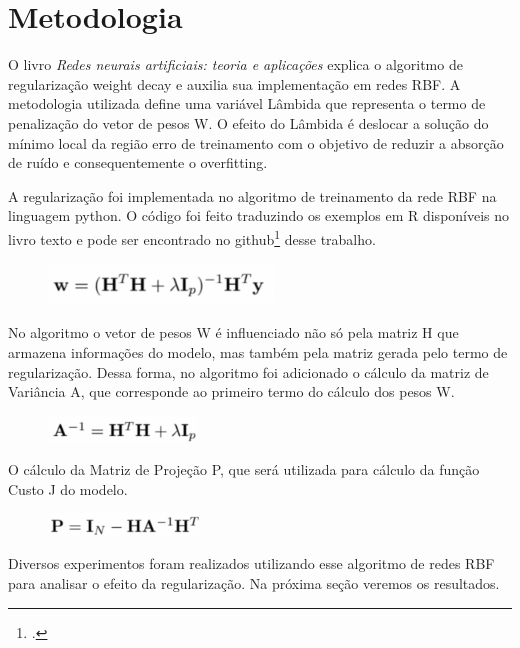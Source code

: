 \section{Metodologia}

O livro \emph{Redes neurais artificiais: teoria e aplicações}\cite{LivroTexto} explica o algoritmo de regularização weight decay
e auxilia sua implementação em redes RBF. A metodologia utilizada define uma variável Lâmbida que representa o termo de penalização do vetor de pesos W.
O efeito do Lâmbida é deslocar a solução do mínimo local da região erro de treinamento com o objetivo de reduzir a absorção de ruído e consequentemente o overfitting.

A regularização foi implementada no algoritmo de treinamento da rede RBF na linguagem python. O código foi feito traduzindo os exemplos em R disponíveis no livro texto e pode ser encontrado no github\footcite{LINK DO GIT} desse trabalho.

\begin{figure}[H]
    \center
    \includegraphics[width=6cm]{images/img9.png}
    \label{img9}
\end{figure}

No algoritmo o vetor de pesos W é influenciado não só pela matriz H que armazena informações do modelo, mas também pela matriz gerada pelo termo de regularização.
Dessa forma, no algoritmo foi adicionado o cálculo da matriz de Variância A, que corresponde ao primeiro termo do cálculo dos pesos W.

\begin{figure}[H]
    \center
    \includegraphics[width=4cm]{images/img10.png}
\end{figure}

O cálculo da Matriz de Projeção P, que será utilizada para cálculo da função Custo J do modelo.

\begin{figure}[H]
    \center
    \includegraphics[width=4cm]{images/img11.png}
\end{figure}

Diversos experimentos foram realizados utilizando esse algoritmo de redes RBF para analisar o efeito da regularização. Na próxima seção veremos os resultados.
